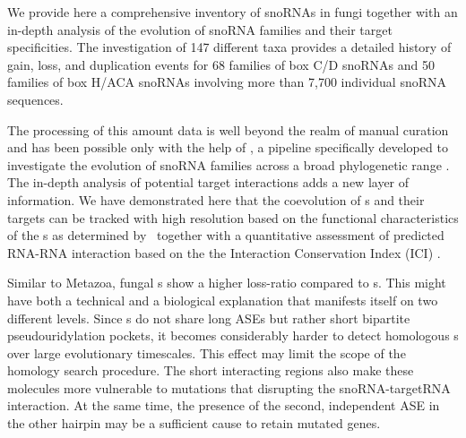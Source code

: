 
We provide here a comprehensive inventory of snoRNAs in fungi together with
an in-depth analysis of the evolution of snoRNA families and their target
specificities. The investigation of 147 different taxa provides a detailed
history of gain, loss, and duplication events for 68 families of box C/D
snoRNAs and 50 families of box H/ACA snoRNAs involving more than 7,700
individual snoRNA sequences. 


The processing of this amount data is well beyond the realm of manual
curation and has been possible only with the help of \snostrip, a pipeline
specifically developed to investigate the evolution of snoRNA families
across a broad phylogenetic range \cite{Bartschat:2014}.  The in-depth
analysis of potential target interactions adds a new layer of
information. We have demonstrated here that the coevolution of \sno s and
their targets can be tracked with high resolution based on the functional
characteristics of the \sno s as determined by \snostrip\ together with a
quantitative assessment of predicted RNA-RNA interaction based on the the
Interaction Conservation Index (ICI) \cite{Kehr:2014}.

Similar to Metazoa, fungal \haca s show a higher loss-ratio compared
to \cd s. This might have both a technical and a biological
explanation that manifests itself on two different levels. Since \haca
s do not share long ASEs but rather short bipartite pseudouridylation
pockets, it becomes considerably harder to detect homologous \sno s
over large evolutionary timescales. This effect may limit the
scope of the homology search procedure. The short interacting regions
also make these molecules more vulnerable to mutations that disrupting
the snoRNA-targetRNA interaction. At the same time, the presence of
the second, independent ASE in the other hairpin may be a sufficient
cause to retain mutated genes.

